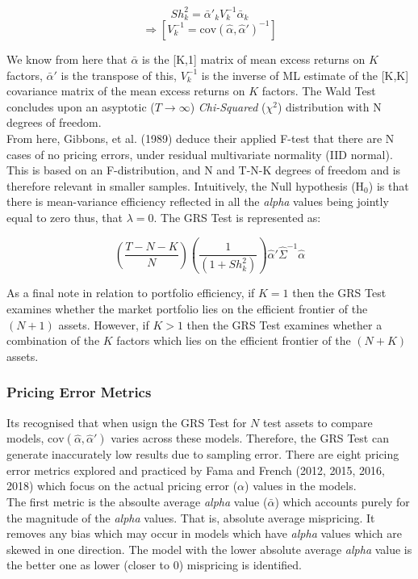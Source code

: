 \documentclass[11pt, english]{article}
\begin{document}
        $$Sh_k^2={\bar{\alpha}'}_kV_k^{-1}{\bar{\alpha}}_k$$
        $$\Rightarrow[V_k^{-1}=\mathrm{cov}(\hat{\alpha},\hat{\alpha}')^{-1}]$$

	We know from here that $\bar{\alpha}$ is the [K,1] matrix of mean excess returns on $K$ factors, ${\bar{\alpha}}'$ is the transpose of this, $V_k^{-1}$ is the inverse of ML estimate of the [K,K] covariance matrix of the mean excess returns on $K$ factors. The Wald Test concludes upon an asyptotic ($T\longrightarrow\infty$) \textit{Chi-Squared} ($\chi^2$) distribution with N degrees of freedom.\\

        From here, Gibbons, et al. (1989) deduce their applied F-test that there are N cases of no pricing errors, under residual multivariate normality (IID normal). This is based on an F-distribution, and N and T-N-K degrees of freedom and is therefore relevant in smaller samples. Intuitively, the Null hypothesis (H$_0$) is that there is mean-variance efficiency reflected in all the \textit{alpha} values being jointly equal to zero thus, that $\lambda=0$. The GRS Test is represented as:

        $$\left(\frac{T-N-K}{N}\right)\left(\frac{1}{(1+Sh_k^2)}\right)\hat{\alpha}'\hat{\Sigma}^{-1}\hat{\alpha}$$

        As a final note in relation to portfolio efficiency, if $K=1$ then the GRS Test examines whether the market portfolio lies on the efficient frontier of the $(N+1)$ assets. However, if $K>1$ then the GRS Test examines whether a combination of the $K$ factors which lies on the efficient frontier of the $(N+K)$ assets.

		\subsubsection*{Pricing Error Metrics}

	Its recognised that when usign the GRS Test for $N$ test assets to compare models, $\mathrm{cov}(\hat{\alpha},\hat{\alpha}')$ varies across these models. Therefore, the GRS Test can generate inaccurately low results due to sampling error. There are eight pricing error metrics explored and practiced by Fama and French (2012, 2015, 2016, 2018) which focus on the actual pricing error ($\alpha$) values in the models.\\

	The first metric is the absoulte average \textit{alpha} value ($\bar{\alpha}$) which accounts purely for the magnitude of the \textit{alpha} values. That is, absolute average mispricing. It removes any bias which may occur in models which have \textit{alpha} values which are skewed in one direction. The model with the lower absolute average \textit{alpha} value is the better one as lower (closer to 0) mispricing is identified.\\
\end{document}
